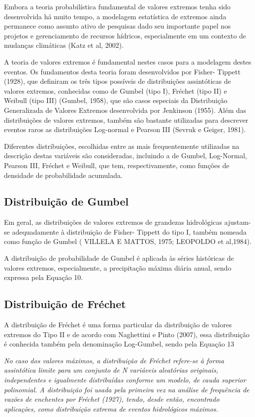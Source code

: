 Embora a teoria probabilística fundamental de valores extremos tenha sido desenvolvida há muito tempo, a modelagem estatística de extremos ainda permanece como assunto ativo de pesquisas dado seu importante papel nos projetos e gerenciamento de recursos hídricos, especialmente em um contexto de mudanças climáticas (Katz et al, 2002).

A teoria de valores extremos é fundamental nestes casos para a modelagem destes eventos. Os fundamentos desta teoria foram desenvolvidos por Fisher- Tippett (1928), que definiram os três tipos possíveis de distribuições assintóticas de valores extremos, conhecidas como de Gumbel (tipo I), Fréchet (tipo II) e Weibull (tipo III) (Gumbel, 1958), que são casos especiais da Distribuição Generalizada de Valores Extremos desenvolvida por Jenkinson (1955). Além das distribuições de valores extremos, também são bastante utilizadas para descrever eventos raros as distribuições Log-normal e Pearson III (Sevruk e Geiger, 1981).

Diferentes distribuições, escolhidas entre as mais frequentemente utilizadas na descrição destas variáveis são consideradas, incluindo a de Gumbel, Log-Normal, Pearson III, Fréchet e Weibull, que tem, respectivamente, como funções de densidade de probabilidade acumulada.

\subsection{Distribuição de Gumbel}

Em geral, as distribuições de valores extremos de grandezas hidrológicas ajustam-se adequadamente à distribuição de Fisher- Tippett do tipo I, também nomeada como função de Gumbel ( VILLELA E MATTOS, 1975; LEOPOLDO et al,1984).

A distribuição de probabilidade de Gumbel é aplicada às séries históricas de valores extremos, especialmente, a precipitação máxima diária anual, sendo expressa pela Equação 10.

\subsection{Distribuição de Fréchet}

A distribuição de Fréchet é uma forma particular da distribuição de valores extremos do Tipo II e de acordo com Naghettini e Pinto (2007), essa distribuição é conhecida também pela denominação Log-Gumbel, sendo pela Equação 13

\textit{No caso dos valores máximos, a distribuição de Fréchet refere-se à forma assintótica limite para um conjunto de N variáveis aleatórias originais, independentes e igualmente distribuídas conforme um modelo, de cauda superior polinomial. A distribuição foi usada pela primeira vez na análise de frequência de vazões de enchentes por Fréchet (1927), tendo, desde então, encontrado aplicações, como distribuição extrema de eventos hidrológicos máximos.}

